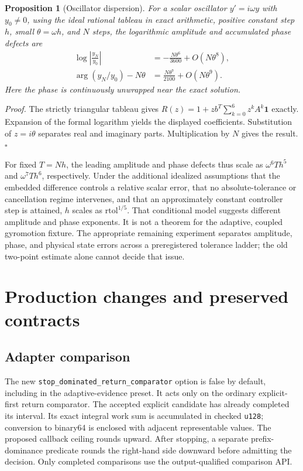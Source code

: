 \documentclass[aps,prd,reprint,amsmath,amssymb,longbibliography,nofootinbib]{revtex4-2}
\newtheorem{proposition}[theorem]{Proposition}
\newcommand{\code}[1]{\texttt{#1}}
\begin{document}
\setcounter{theorem}{4}
\begin{proposition}[Oscillator dispersion]
For a scalar oscillator $y'=i\omega y$ with $y_0\ne0$, using the ideal rational tableau in exact arithmetic, positive constant step $h$, small $\theta=\omega h$, and $N$ steps, the logarithmic amplitude and accumulated phase defects are
\begin{align}
\log\left|\frac{y_N}{y_0}\right|
  &=-\frac{N\theta^6}{3600}+O(N\theta^8),\\
\arg(y_N/y_0)-N\theta
  &=\frac{N\theta^7}{2100}+O(N\theta^9).
\end{align}
Here the phase is continuously unwrapped near the exact solution.
\end{proposition}
\noindent\emph{Proof.} The strictly triangular tableau gives
$R(z)=1+zb^T\sum_{k=0}^{6}z^kA^k\mathbf1$ exactly. Expansion of the formal logarithm yields the displayed coefficients. Substitution of $z=i\theta$ separates real and imaginary parts. Multiplication by $N$ gives the result.\hfill$\square$

For fixed $T=Nh$, the leading amplitude and phase defects thus scale as $\omega^6Th^5$ and $\omega^7Th^6$, respectively. Under the additional idealized assumptions that the embedded difference controls a relative scalar error, that no absolute-tolerance or cancellation regime intervenes, and that an approximately constant controller step is attained, $h$ scales as $\mathrm{rtol}^{1/5}$. That conditional model suggests different amplitude and phase exponents. It is not a theorem for the adaptive, coupled gyromotion fixture. The appropriate remaining experiment separates amplitude, phase, and physical state errors across a preregistered tolerance ladder; the old two-point estimate alone cannot decide that issue.

\section{Production changes and preserved contracts}
\label{sec:code}
\subsection{Adapter comparison}
The new \code{stop\_dominated\_return\_comparator} option is false by default, including in the adaptive-evidence preset. It acts only on the ordinary explicit-first return comparator. The accepted explicit candidate has already completed its interval. Its exact integral work sum is accumulated in checked \code{u128}; conversion to binary64 is enclosed with adjacent representable values. The proposed callback ceiling rounds upward. After stopping, a separate prefix-dominance predicate rounds the right-hand side downward before admitting the decision. Only completed comparisons use the output-qualified comparison API.
\end{document}
